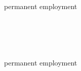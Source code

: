 \newcommand{\HRule}{\rule{\linewidth}{1pt}}

\begin{center}
  {\noindent\fontfamily{\sfdefault}\LARGE\bfseries\proposalTitle } \\[18pt]
\end{center}

\noindent\begin{minipage}{0.43\textwidth}
	\begin{center} 
		\fontfamily{\sfdefault}
		\textbf{\GroupAProf} \\[6pt]%
		\emph{\GroupA}\\[1pt]
		\textsf{\GroupAUniversity\\[6pt]
		\GroupAEmployment\\permanent employment}
	\end{center}
 \end{minipage}
\hfill
\noindent\begin{minipage}{0.43\textwidth}
	\begin{center} 
		\fontfamily{\sfdefault}
		\textbf{\GroupBProf} \\[6pt]%
		\emph{\GroupB}\\[1pt]
		\textsf{\GroupBUniversity\\[6pt]
		\GroupBEmployment\\permanent employment}
	\end{center}
 \end{minipage}



